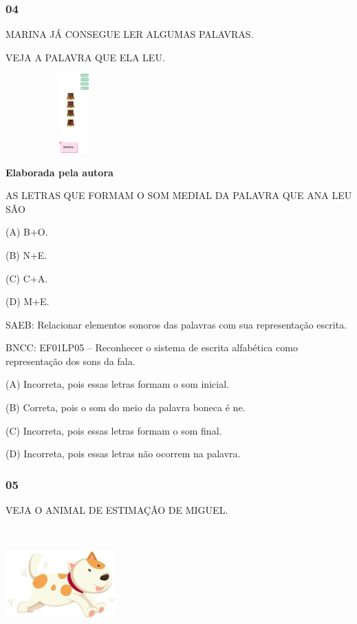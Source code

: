 \subsubsection{04}\label{section-44}

MARINA JÁ CONSEGUE LER ALGUMAS PALAVRAS.

VEJA A PALAVRA QUE ELA LEU.

\includegraphics[width=2.07917in,height=1.19306in]{media/image213.png}

\textbf{Elaborada pela autora}

AS LETRAS QUE FORMAM O SOM MEDIAL DA PALAVRA QUE ANA LEU SÃO

(A) B+O.

(B) N+E.

(C) C+A.

(D) M+E.

SAEB: Relacionar elementos sonoros das palavras com sua
representação escrita.

BNCC: EF01LP05 -- Reconhecer o sistema de escrita alfabética como
representação dos sons da fala.

(A) Incorreta, pois essas letras formam o som inicial.

(B) Correta, pois o som do meio da palavra boneca é ne.

(C) Incorreta, pois essas letras formam o som final.

(D) Incorreta, pois essas letras não ocorrem na palavra.\protect\hypertarget{_heading=h.1meprgjlpdif}{}{}

\subsubsection{05}\label{section-45}

VEJA O ANIMAL DE ESTIMAÇÃO DE MIGUEL.

\includegraphics[width=1.65208in,height=1.75972in]{media/image214.jpg}


